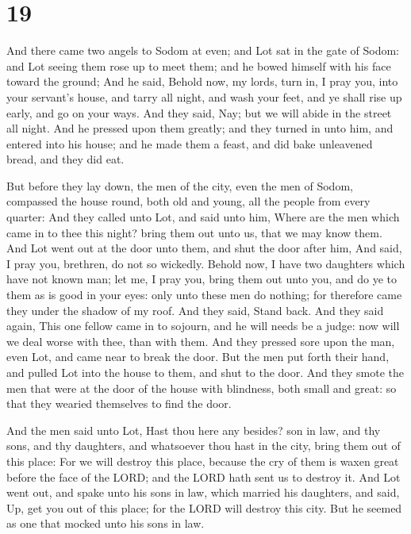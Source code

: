 \hypertarget{section-18}{%
\section{19}\label{section-18}}

 And there came two angels to Sodom at even; and Lot sat in
the gate of Sodom: and Lot seeing them rose up to meet them; and he
bowed himself with his face toward the ground;  And he said,
Behold now, my lords, turn in, I pray you, into your servant's house,
and tarry all night, and wash your feet, and ye shall rise up early, and
go on your ways. And they said, Nay; but we will abide in the street all
night.  And he pressed upon them greatly; and they turned in
unto him, and entered into his house; and he made them a feast, and did
bake unleavened bread, and they did eat.

 But before they lay down, the men of the city, even the men
of Sodom, compassed the house round, both old and young, all the people
from every quarter:  And they called unto Lot, and said unto
him, Where are the men which came in to thee this night? bring them out
unto us, that we may know them.  And Lot went out at the
door unto them, and shut the door after him,  And said, I
pray you, brethren, do not so wickedly.  Behold now, I have
two daughters which have not known man; let me, I pray you, bring them
out unto you, and do ye to them as is good in your eyes: only unto these
men do nothing; for therefore came they under the shadow of my roof.
 And they said, Stand back. And they said again, This one
fellow came in to sojourn, and he will needs be a judge: now will we
deal worse with thee, than with them. And they pressed sore upon the
man, even Lot, and came near to break the door.  But the
men put forth their hand, and pulled Lot into the house to them, and
shut to the door.  And they smote the men that were at the
door of the house with blindness, both small and great: so that they
wearied themselves to find the door.

 And the men said unto Lot, Hast thou here any besides? son
in law, and thy sons, and thy daughters, and whatsoever thou hast in the
city, bring them out of this place:  For we will destroy
this place, because the cry of them is waxen great before the face of
the LORD; and the LORD hath sent us to destroy it.  And Lot
went out, and spake unto his sons in law, which married his daughters,
and said, Up, get you out of this place; for the LORD will destroy this
city. But he seemed as one that mocked unto his sons in law.

